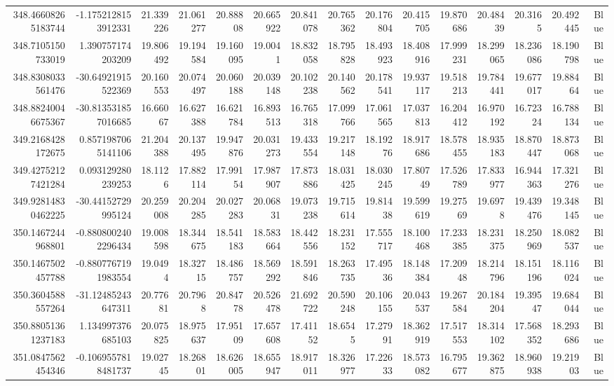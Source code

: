 \begin{center}
\begin{longtable}{rrrrrrrrrrrrrrr}
348.46608265183744 & -1.1752128153912331 & 21.339226 & 21.061277 & 20.88808 & 20.665922 & 20.841078 & 20.765362 & 20.176804 & 20.415705 & 19.870686 & 20.48439 & 20.3165 & 20.492445 & Blue \\
348.7105150733019 & 1.390757174203209 & 19.806492 & 19.194584 & 19.160095 & 19.0041 & 18.832058 & 18.795828 & 18.493923 & 18.408916 & 17.999231 & 18.299065 & 18.236086 & 18.190798 & Blue \\
348.8308033561476 & -30.64921915522369 & 20.160553 & 20.074497 & 20.060188 & 20.039148 & 20.102238 & 20.140562 & 20.178541 & 19.937117 & 19.518213 & 19.784441 & 19.677017 & 19.88464 & Blue \\
348.88240046675367 & -30.813531857016685 & 16.66067 & 16.627388 & 16.621784 & 16.893513 & 16.765318 & 17.099766 & 17.061565 & 17.037813 & 16.204412 & 16.970192 & 16.72324 & 16.788134 & Blue \\
349.2168428172675 & 0.8571987065141106 & 21.204388 & 20.137495 & 19.947876 & 20.031273 & 19.433554 & 19.217148 & 18.19276 & 18.917686 & 18.578455 & 18.935183 & 18.870447 & 18.873068 & Blue \\
349.42752127421284 & 0.093129280239253 & 18.1126 & 17.882114 & 17.99154 & 17.987907 & 17.873886 & 18.031425 & 18.030245 & 17.80749 & 17.526789 & 17.833977 & 16.944363 & 17.321276 & Blue \\
349.92814830462225 & -30.44152729995124 & 20.259008 & 20.204285 & 20.027283 & 20.06831 & 19.073238 & 19.715614 & 19.81438 & 19.599619 & 19.27569 & 19.6978 & 19.439476 & 19.348145 & Blue \\
350.1467244968801 & -0.8808002402296434 & 19.008598 & 18.344675 & 18.541183 & 18.583664 & 18.442556 & 18.231152 & 17.555717 & 18.100468 & 17.233385 & 18.231375 & 18.250969 & 18.082537 & Blue \\
350.1467502457788 & -0.8807767191983554 & 19.0494 & 18.32715 & 18.486757 & 18.569292 & 18.591846 & 18.263735 & 17.49536 & 18.148384 & 17.20948 & 18.214796 & 18.151196 & 18.116024 & Blue \\
350.3604588557264 & -31.12485243647311 & 20.77681 & 20.7968 & 20.84778 & 20.526478 & 21.692722 & 20.590248 & 20.106155 & 20.043537 & 19.267584 & 20.184204 & 19.39547 & 19.684044 & Blue \\
350.88051361237183 & 1.134997376685103 & 20.075825 & 18.975637 & 17.95109 & 17.657608 & 17.41152 & 18.6545 & 17.27991 & 18.362919 & 17.517553 & 18.314102 & 17.568352 & 18.293686 & Blue \\
351.0847562454346 & -0.1069557818481737 & 19.02745 & 18.26801 & 18.626005 & 18.655947 & 18.917011 & 18.326977 & 17.22633 & 18.573082 & 16.795677 & 19.362875 & 18.960938 & 19.21903 & Blue \\

\end{longtable}
\end{center}
